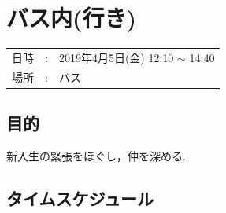 

\section{バス内(行き)}

\begin{tabular}{p{}rp{}}
  日時 & : & 2019年4月5日(金) 12:10 $\sim$ 14:40\\ %
  場所 & : & バス
\end{tabular}

\subsection{目的}
新入生の緊張をほぐし，仲を深める.


\subsection{タイムスケジュール}
